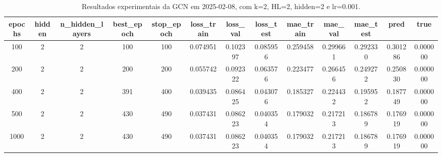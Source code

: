 \begin{table}[h]
\centering
\caption{Resultados experimentais da GCN em 2025-02-08, com k=2, HL=2, hidden=2 e lr=0.001.}
\label{tab:gcn_results_k2_hl2_h2_d20250208}
\begin{tabular}{ccccccccccccc}
\toprule
epochs & hidden & n\_hidden\_layers & best\_epoch & stop\_epoch & loss\_train & loss\_val & loss\_test & mae\_train & mae\_val & mae\_test & pred & true \\
\midrule
100 & 2 & 2 & 100 & 100 & 0.074951 & 0.102397 & 0.085956 & 0.259458 & 0.299661 & 0.292330 & 0.301286 & 0.000000 \\
200 & 2 & 2 & 200 & 200 & 0.055742 & 0.092322 & 0.063576 & 0.223477 & 0.266456 & 0.249272 & 0.250830 & 0.000000 \\
400 & 2 & 2 & 391 & 400 & 0.039435 & 0.086425 & 0.043076 & 0.185327 & 0.224432 & 0.195952 & 0.187749 & 0.000000 \\
500 & 2 & 2 & 430 & 490 & 0.037431 & 0.086223 & 0.040354 & 0.179032 & 0.217213 & 0.186789 & 0.176919 & 0.000000 \\
1000 & 2 & 2 & 430 & 490 & 0.037431 & 0.086223 & 0.040354 & 0.179032 & 0.217213 & 0.186789 & 0.176919 & 0.000000 \\
\bottomrule
\end{tabular}
\end{table}
